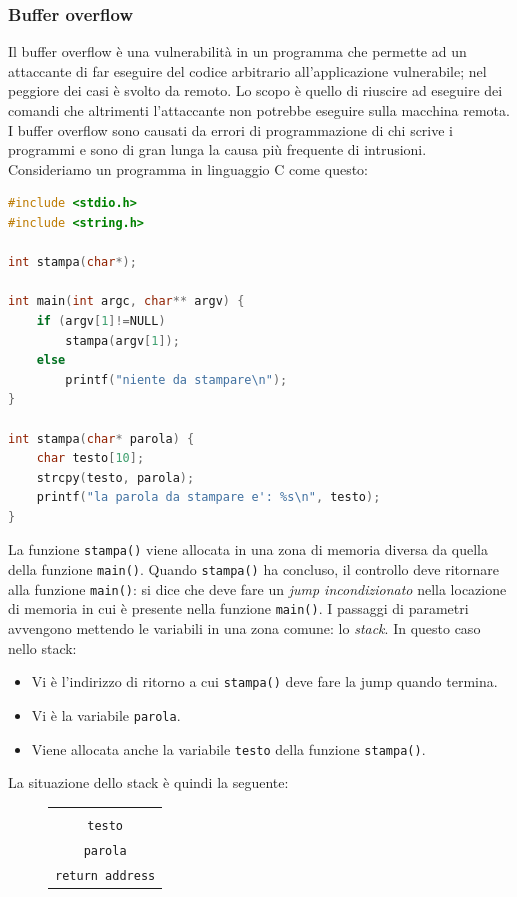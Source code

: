 \subsubsection{Buffer overflow}
Il buffer overflow è una vulnerabilità in un programma che permette ad un attaccante di far eseguire del codice arbitrario all'applicazione vulnerabile; nel peggiore dei casi è svolto da remoto. Lo scopo è quello di riuscire ad eseguire dei comandi che altrimenti l'attaccante non potrebbe eseguire sulla macchina remota. I buffer overflow sono causati da errori di programmazione di chi scrive i programmi e sono di gran lunga la causa più frequente di intrusioni. Consideriamo un programma in linguaggio C come questo:
\begin{lstlisting}[language=C]
#include <stdio.h>
#include <string.h>

int stampa(char*);

int main(int argc, char** argv) {
	if (argv[1]!=NULL)
		stampa(argv[1]);
	else
		printf("niente da stampare\n");
}
	
int stampa(char* parola) {
	char testo[10];
	strcpy(testo, parola);
	printf("la parola da stampare e': %s\n", testo);
}
\end{lstlisting}
La funzione \texttt{stampa()} viene allocata in una zona di memoria diversa da quella della funzione \texttt{main()}. Quando \texttt{stampa()} ha concluso, il controllo deve ritornare alla funzione \texttt{main()}: si dice che deve fare un \textit{jump incondizionato} nella locazione di memoria in cui è presente nella funzione \texttt{main()}. I passaggi di parametri avvengono mettendo le variabili in una zona comune: lo \textit{stack}. In questo caso nello stack:
\begin{itemize}
	\item Vi è l'indirizzo di ritorno a cui \texttt{stampa()} deve fare la jump quando termina.
	\item Vi è la variabile \texttt{parola}.
	\item Viene allocata anche la variabile \texttt{testo} della funzione \texttt{stampa()}.
\end{itemize}
La situazione dello stack è quindi la seguente:
\begin{figure}[htbp]
	\centering
	\begin{tabular}{|c|}
		\\ \\ \hline \\
		\hline
		\texttt{\small testo} \\
		\hline
		\texttt{\small parola} \\
		\hline
		\texttt{\small return address} \\
		\hline
	\end{tabular}
\end{figure}\\
